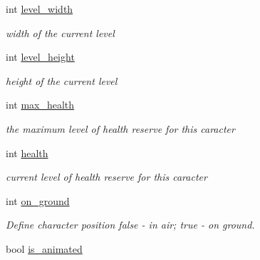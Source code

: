 \begin{DoxyCompactItemize}
\mbox{\label{class_player_a5a61bfa96e90f3fbf5d89efc0872915f}} 
int \hyperlink{class_player_a5a61bfa96e90f3fbf5d89efc0872915f}{level\+\_\+width}
\begin{DoxyCompactList}\small\item\em width of the current level \end{DoxyCompactList}\item 
\mbox{\label{class_player_a5543a988cb2e91cf2e61b60ff5382ce9}} 
int \hyperlink{class_player_a5543a988cb2e91cf2e61b60ff5382ce9}{level\+\_\+height}
\begin{DoxyCompactList}\small\item\em height of the current level \end{DoxyCompactList}\item 
\mbox{\label{class_player_ad38061042ee0864383dab6935fa0acea}} 
int \hyperlink{class_player_ad38061042ee0864383dab6935fa0acea}{max\+\_\+health}
\begin{DoxyCompactList}\small\item\em the maximum level of health reserve for this caracter \end{DoxyCompactList}\item 
\mbox{\label{class_player_aad33b52bfe73c4c978a3135172f286a0}} 
int \hyperlink{class_player_aad33b52bfe73c4c978a3135172f286a0}{health}
\begin{DoxyCompactList}\small\item\em current level of health reserve for this caracter \end{DoxyCompactList}\item 
\mbox{\label{class_player_a2dc679f61d4728895221afb567aede2f}} 
int \hyperlink{class_player_a2dc679f61d4728895221afb567aede2f}{on\+\_\+ground}
\begin{DoxyCompactList}\small\item\em Define character position \textquotesingle{}false\textquotesingle{} -\/ in air; \textquotesingle{}true\textquotesingle{} -\/ on ground. \end{DoxyCompactList}\item 
\mbox{\label{class_player_a9f581a28a4ffac4120411abb6d8ffb34}} 
bool \hyperlink{class_player_a9f581a28a4ffac4120411abb6d8ffb34}{is\+\_\+animated}

\end{DoxyCompactItemize}
